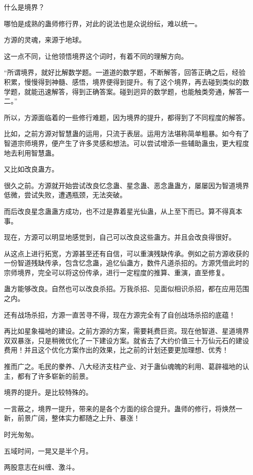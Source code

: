 \begin{this_body}
什么是境界？

哪怕是成熟的蛊师修行界，对此的说法也是众说纷纭，难以统一。

方源的灵魂，来源于地球。

这一点不同，让他领悟境界这个词时，有着不同的理解方向。

“所谓境界，就好比解数学题。一道道的数学题，不断解答，回答正确之后，经验积累，慢慢得到神髓、感悟，境界便得到提升。有了这个境界，再去碰到类似的数学题，就能迅速解答，得到正确答案。碰到迥异的数学题，也能触类旁通，解答一二。”

所以，方源面临着的一些修行难题，因为境界的提升，都得到了不同程度的解答。

比如，之前方源对智慧蛊的运用，只流于表层。运用方法堪称简单粗暴。如今有了智道宗师境界，便产生了许多灵感和想法。可以尝试增添一些辅助蛊虫，更大程度地去利用智慧蛊。

又比如改良蛊方。

很久之前。方源就开始尝试改良忆念蛊、星念蛊、恶念蛊蛊方，屡屡因为智道境界低微，尝试失败，遭遇瓶颈，无法突破。

而后改良星念蛊蛊方成功，也不过是靠着星光仙蛊，从上至下而已。算不得真本事。

现在，方源可以明显地感觉到，自己可以改良这些蛊方。并且会改良得很好。

从这点上进行拓宽，方源甚至还有自信，可以重演残缺传承。例如之前方源收获的一份智道残缺传承，包含忆念蛊，追忆仙蛊方，数件凡道杀招的。方源凭借此时的宗师境界，完全可以将这份传承，进行一定程度的推算、重演，直至修复。

蛊方能够改良。自然也可以改良杀招。万我杀招、见面似相识杀招，都在应用范围之内。

还有战场杀招，方源一直苦寻不得，现在方源完全有了自创战场杀招的底蕴！

再比如星象福地的建设。之前方源的方案，需要耗费巨资。现在他智道、星道境界双双暴涨，只是稍微优化了一下建设方案。就省去了大约价值三十万仙元石的建设费用！并且这个优化方案作出的效果，比之前的计划还要更加理想、优秀！

推而广之。毛民的豢养、八大经济支柱产业、对于蛊仙魂魄的利用、葛辟福地的认主，都有了许多崭新的前景。

境界的提升。是比较特殊的。

一言蔽之，境界一提升，带来的是各个方面的综合提升。蛊师的修行，将焕然一新，前景广阔，整体实力都随之上升、暴涨！

时光匆匆。

五域时间，一晃又是半个月。

两股意志在纠缠、激斗。


\end{this_body}

